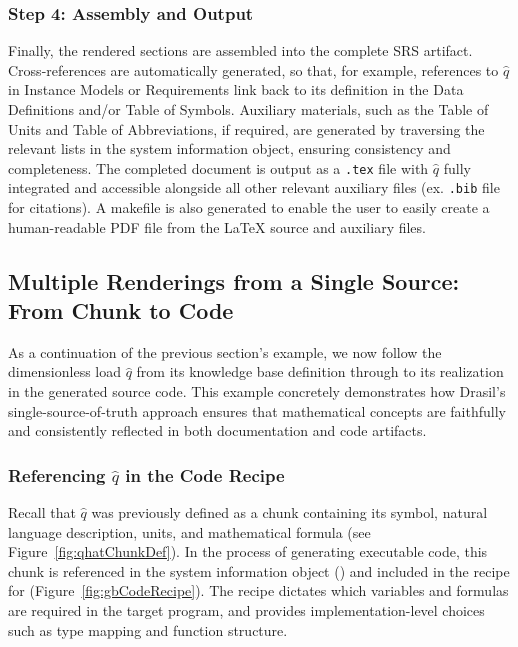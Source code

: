 \subsubsection{Step 4: Assembly and Output}

Finally, the rendered sections are assembled into the complete SRS artifact. 
Cross-references are automatically generated, so that, for example, references 
to $\hat{q}$ in Instance Models or Requirements link back to its definition in 
the Data Definitions and/or Table of Symbols. Auxiliary materials, such as the 
Table of Units and Table of Abbreviations, if required, are generated by 
traversing the relevant lists in the system information object, ensuring 
consistency and completeness. The completed document is output as a 
\texttt{.tex} file with $\hat{q}$ fully integrated and accessible 
alongside all other relevant auxiliary files (ex. \texttt{.bib} file for 
citations). A makefile is also generated to 
enable the user to easily create a human-readable PDF file from the \LaTeX 
source and auxiliary files.

\subsection{Multiple Renderings from a Single Source: From Chunk to Code}

As a continuation of the previous section’s example, we now follow the 
dimensionless load $\hat{q}$ from its knowledge base definition through to its 
realization in the generated source code. This example concretely demonstrates 
how Drasil’s single-source-of-truth approach ensures that mathematical concepts 
are faithfully and consistently reflected in both documentation and code 
artifacts.

\subsubsection{Referencing $\hat{q}$ in the Code Recipe}

Recall that $\hat{q}$ was previously defined as a chunk containing its symbol, 
natural language description, units, and mathematical formula (see 
Figure~\ref{fig:qhatChunkDef}). In the process of generating executable code, 
this chunk is referenced in the system information object () and 
included in the  recipe for 
\gb{}(Figure~\ref{fig:gbCodeRecipe}). The recipe dictates which variables and 
formulas are required in the target program, and provides implementation-level 
choices such as type mapping and function structure.


